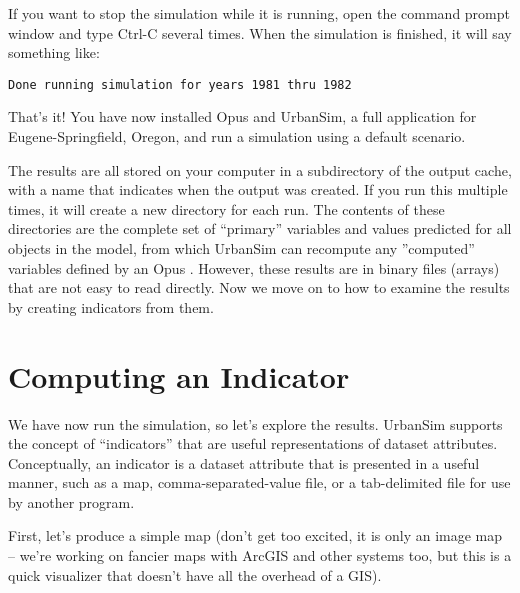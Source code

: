 \documentclass{howto}
\begin{document}
\begin{enumerate}
If you want to stop the simulation while it is running, open the
command prompt window and type Ctrl-C several times. When the
simulation is finished, it will say something like:

\begin{verbatim}
Done running simulation for years 1981 thru 1982
\end{verbatim}

\end{enumerate}

That's it!  You have now installed Opus and UrbanSim, a full
application for Eugene-Springfield, Oregon, and run a simulation
using a default scenario.

The results are all stored on your computer in a subdirectory of the
output cache, with a name that indicates when the output was
created. If you run this multiple times, it will create a new
directory for each run.  The contents of these directories are the
complete set of ``primary'' variables and values predicted for all objects in
the model, from which UrbanSim can recompute any ''computed'' variables defined
by an Opus .  However, these results are in binary files (arrays) that
are not easy to read directly.  Now we move on to how to examine the results by
creating indicators from them.

\section*{Computing an Indicator}

We have now run the simulation, so let's explore the results.
UrbanSim supports the concept of ``indicators'' that are useful
representations of dataset attributes.  Conceptually, an indicator
is a dataset attribute that is presented in a useful manner, such as
a map, comma-separated-value file, or a tab-delimited file for use by
another program.

First, let's produce a simple map (don't get too excited, it is only
an image map -- we're working on fancier maps with ArcGIS and other
systems too, but this is a quick visualizer that doesn't have all
the overhead of a GIS).
\end{document}
